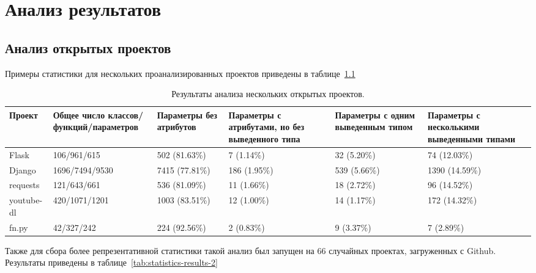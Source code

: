 \chapter{Анализ результатов}

\section{Анализ открытых проектов}
\label{sec:projects-analysis}

Примеры статистики для нескольких проанализированных проектов приведены в
таблице~\ref{tab:statistic-results-1}

\begin{table}[H]
  \scriptsize
  \caption{Результаты анализа нескольких открытых проектов.}
  \label{tab:statistic-results-1}
  \begin{tabularx}{\textwidth}{ |X|X|X|X|X|X| }
    \hline
    Проект & Общее число классов/функций/параметров & Параметры без атрибутов &
    Параметры с атрибутами, но без выведенного типа & 
    Параметры с одним выведенным типом & 
    Параметры с несколькими выведенными типами \\ \hline

    Flask & 106/961/615 & 502 (81.63\%) & 7 (1.14\%) & 32 (5.20\%) & 74 (12.03\%)
    \\ \hline

    Django & 1696/7494/9530 & 7415 (77.81\%) & 186 (1.95\%) & 539 (5.66\%) &
    1390 (14.59\%)
    \\ \hline

    requests & 121/643/661 & 536 (81.09\%) & 11 (1.66\%) & 18 (2.72\%) & 96
    (14.52\%)
    \\ \hline

    youtube-dl & 420/1071/1201 & 1003 (83.51\%) & 12 (1.00\%) & 14 (1.17\%)
    & 172 (14.32\%)
    \\ \hline

    fn.py & 42/327/242 &  224 (92.56\%) & 2 (0.83\%) & 9 (3.37\%) & 7
    (2.89\%)
    \\ \hline

  \end{tabularx}
\end{table}

Также для сбора более репрезентативной статистики такой анализ был запущен на 66
случайных проектах, загруженных с Github. Результаты приведены в
таблице~\ref{tab:statistics-results-2}

